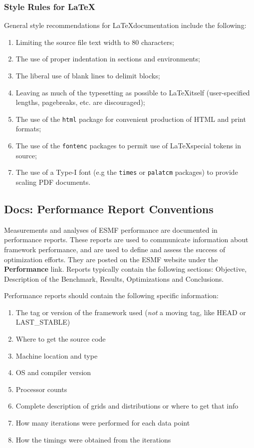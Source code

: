

\subsubsection{Style Rules for \LaTeX}

General style recommendations for \LaTeX documentation include the
following:

\begin{enumerate}
\item Limiting the source file text width to 80 characters;
\item The use of proper indentation in sections and environments;
\item The liberal use of blank lines to delimit blocks;
\item Leaving as much of the typesetting as possible to \LaTeX itself
  (user-specified lengths, pagebreaks, etc. are discouraged);
\item The use of the \texttt{html} package for convenient production
  of HTML and print formats;
\item The use of the \texttt{fontenc} packages
  to permit use of \LaTeX special tokens in source;
\item The use of a Type-I font (e.g the \texttt{times} or
  \texttt{palatcm} packages) to provide scaling PDF documents.
\end{enumerate}

\subsection{Docs: Performance Report Conventions}
Measurements and analyses of ESMF performance are documented in
performance reports.  These reports are used to communicate 
information about framework performance, and are used to
define and assess the success of optimization efforts.
They are posted on the ESMF website under the {\bf Performance}
link.  Reports typically contain the following sections:  Objective,
Description of the Benchmark,  Results, Optimizations 
and Conclusions.

Performance reports should contain the following specific 
information:
\begin{enumerate}
\item The tag or version of the framework used ({\it not} a moving tag,
like HEAD or LAST\_STABLE)
\item Where to get the source code
\item Machine location and type
\item OS and compiler version
\item Processor counts
\item Complete description of grids and distributions or where
to get that info
\item How many iterations were performed for each data point
\item How the timings were obtained from the iterations 
\end{enumerate}

